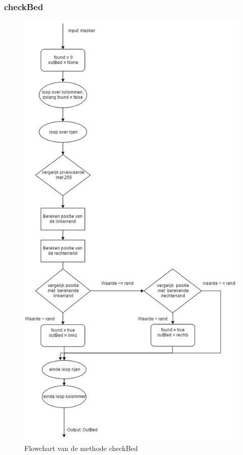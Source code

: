 \subsubsection{checkBed}
\begin{figure}[h]
	\includegraphics[scale=0.45]{FlowShart_checkBed}
	\caption{Flowchart van de methode checkBed}
	\label{imgFCCBe}
\end{figure}
